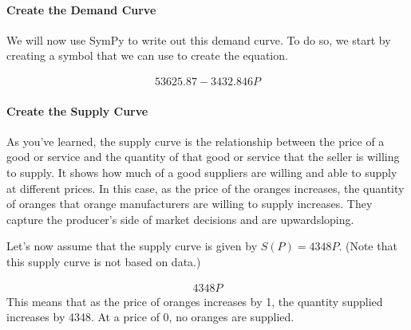 \documentclass[letterpaper,10pt,english]{jupyterBook}
\begin{document}
\paragraph{Create the Demand Curve}
\label{\detokenize{content/02-supply/03-market-equilibria:create-the-demand-curve}}
\sphinxAtStartPar
We will now use SymPy to write out this demand curve. To do so, we start by creating a symbol  that we can use to create the equation.

\begin{sphinxVerbatim}[commandchars=\\\{\}]
  
      
\end{sphinxVerbatim}
\begin{equation*}
\begin{split}\displaystyle 53625.87 - 3432.846 P\end{split}
\end{equation*}

\paragraph{Create the Supply Curve}
\label{\detokenize{content/02-supply/03-market-equilibria:create-the-supply-curve}}
\sphinxAtStartPar
As you’ve learned, the supply curve is the relationship between the price of a good or service and the quantity of that good or service that the seller is willing to supply. It shows how much of a good suppliers are willing and able to supply at different prices. In this case, as the price of the oranges increases, the quantity of oranges that orange manufacturers are willing to supply increases. They capture the producer’s side of market decisions and are upward\sphinxhyphen{}sloping.

\sphinxAtStartPar
Let’s now assume that the supply curve is given by \(S(P) = 4348P\). (Note that this supply curve is not based on data.)

\begin{sphinxVerbatim}[commandchars=\\\{\}]
    
\end{sphinxVerbatim}
\begin{equation*}
\begin{split}\displaystyle 4348 P\end{split}
\end{equation*}
\sphinxAtStartPar
This means that as the price of oranges increases by 1, the quantity supplied increases by 4348. At a price of 0, no oranges are supplied.
\end{document}
